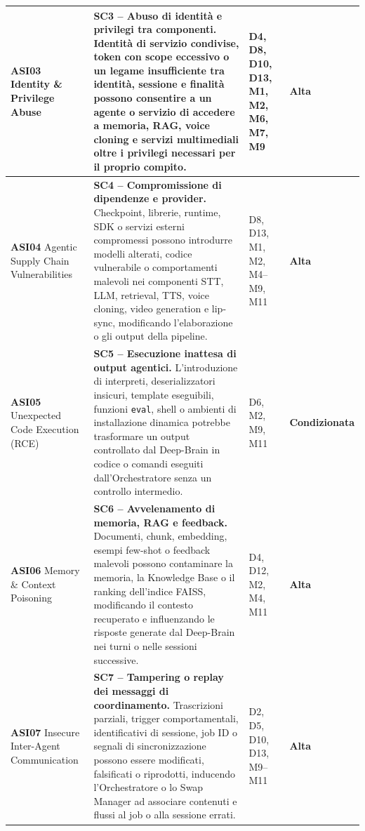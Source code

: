 \documentclass[11pt,a4paper]{article}
\newcommand{\appAlta}{\cellcolor{RiskHigh}\textbf{Alta}}
\newcommand{\condizionata}{\cellcolor{SoftBlue}\textbf{Condizionata}}
\begin{document}
\begin{longtable}{
    |C{2.05cm}|
    L{\dimexpr\textwidth-2.05cm-2.20cm-2.25cm-8\arrayrulewidth\relax}|
    C{2.20cm}|
    C{2.25cm}|
}
\textbf{ASI03} \newline Identity \& Privilege Abuse
&
\textbf{SC3 -- Abuso di identità e privilegi tra componenti.}
Identità di servizio condivise, token con scope eccessivo o un legame
insufficiente tra identità, sessione e finalità possono consentire a un
agente o servizio di accedere a memoria, RAG, voice cloning e servizi
multimediali oltre i privilegi necessari per il proprio compito.
&
D4, D8, D10, D13, M1, M2, M6, M7, M9
&
\appAlta
\\
\hline


\textbf{ASI04} \newline Agentic Supply Chain Vulnerabilities
&
\textbf{SC4 -- Compromissione di dipendenze e provider.}
Checkpoint, librerie, runtime, SDK o servizi esterni compromessi
possono introdurre modelli alterati, codice vulnerabile o comportamenti
malevoli nei componenti STT, LLM, retrieval, TTS, voice cloning, video
generation e lip-sync, modificando l'elaborazione o gli output della
pipeline.
&
D8, D13, M1, M2, M4--M9, M11
&
\appAlta
\\
\hline


\textbf{ASI05} \newline Unexpected Code Execution (RCE)
&
\textbf{SC5 -- Esecuzione inattesa di output agentici.}
L'introduzione di interpreti, deserializzatori insicuri, template
eseguibili, funzioni \texttt{eval}, shell o ambienti di installazione
dinamica potrebbe trasformare un output controllato dal Deep-Brain in
codice o comandi eseguiti dall'Orchestratore senza un controllo
intermedio.
&
D6, M2, M9, M11
&
\condizionata
\\
\hline


\textbf{ASI06} \newline Memory \& Context Poisoning
&
\textbf{SC6 -- Avvelenamento di memoria, RAG e feedback.}
Documenti, chunk, embedding, esempi few-shot o feedback malevoli
possono contaminare la memoria, la Knowledge Base o il ranking
dell'indice FAISS, modificando il contesto recuperato e influenzando le
risposte generate dal Deep-Brain nei turni o nelle sessioni
successive.
&
D4, D12, M2, M4, M11
&
\appAlta
\\
\hline


\textbf{ASI07} \newline Insecure Inter-Agent Communication
&
\textbf{SC7 -- Tampering o replay dei messaggi di coordinamento.}
Trascrizioni parziali, trigger comportamentali, identificativi di
sessione, job ID o segnali di sincronizzazione possono essere
modificati, falsificati o riprodotti, inducendo l'Orchestratore o lo
Swap Manager ad associare contenuti e flussi al job o alla sessione
errati.
&
D2, D5, D10, D13, M9--M11
&
\appAlta
\\
\hline



\end{longtable}
\end{document}
